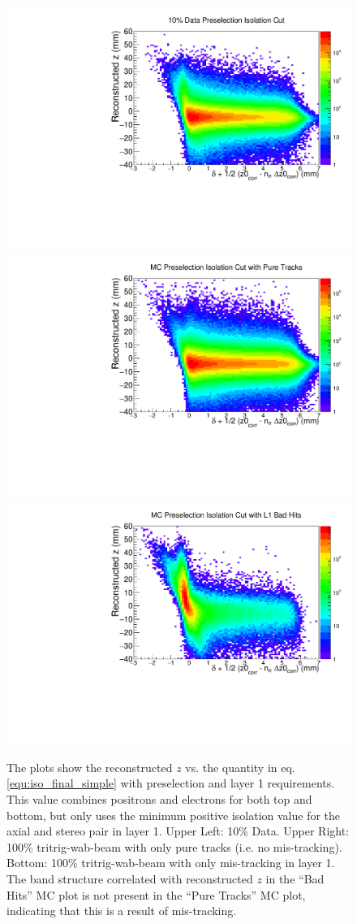 

\begin{figure}[t]
    \centering
    \includegraphics[width=.45\textwidth]{figs/selection/isocut_data_z.pdf}
    \includegraphics[width=.45\textwidth]{figs/selection/isocut_mc_puretracks_z.pdf}
    \includegraphics[width=.45\textwidth]{figs/selection/isocut_mc_badtracks_z.pdf}
    \caption{The plots show the reconstructed $z$ vs. the quantity in eq. \ref{equ:iso_final_simple} with preselection and layer 1 requirements. This value combines positrons and electrons for both top and bottom, but only uses the minimum positive isolation value for the axial and stereo pair in layer 1. Upper Left: 10\% Data. Upper Right: 100\% tritrig-wab-beam with only pure tracks (i.e. no mis-tracking). Bottom: 100\% tritrig-wab-beam with only mis-tracking in layer 1. The band structure correlated with reconstructed $z$ in the ``Bad Hits'' MC plot is not present in the ``Pure Tracks'' MC plot, indicating that this is a result of mis-tracking.}
    \label{fig:iso_cut_data}
\end{figure}

